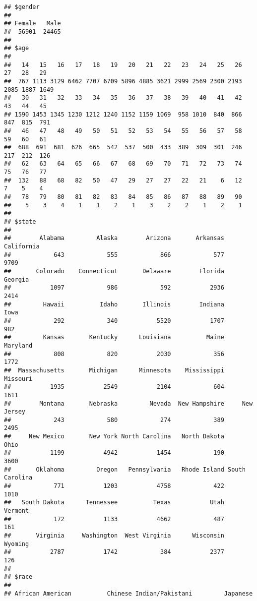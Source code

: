 \documentclass[
]{article}
\begin{document}
\begin{verbatim}
## $gender
## 
## Female   Male 
##  56901  24465 
## 
## $age
## 
##   14   15   16   17   18   19   20   21   22   23   24   25   26   27   28   29 
##  767 1113 3129 6462 7707 6709 5896 4885 3621 2999 2569 2300 2193 2085 1887 1649 
##   30   31   32   33   34   35   36   37   38   39   40   41   42   43   44   45 
## 1590 1453 1345 1230 1212 1240 1152 1159 1069  958 1010  840  866  847  815  791 
##   46   47   48   49   50   51   52   53   54   55   56   57   58   59   60   61 
##  688  691  681  626  665  542  537  500  433  389  309  301  246  217  212  126 
##   62   63   64   65   66   67   68   69   70   71   72   73   74   75   76   77 
##  132   88   68   82   50   47   29   27   27   22   21    6   12    7    5    4 
##   78   79   80   81   82   83   84   85   86   87   88   89   90 
##    5    3    4    1    1    2    1    3    2    2    1    2    1 
## 
## $state
## 
##        Alabama         Alaska        Arizona       Arkansas     California 
##            643            555            866            577           9709 
##       Colorado    Connecticut       Delaware        Florida        Georgia 
##           1097            986            592           2936           2414 
##         Hawaii          Idaho       Illinois        Indiana           Iowa 
##            292            340           5520           1707            982 
##         Kansas       Kentucky      Louisiana          Maine       Maryland 
##            808            820           2030            356           1772 
##  Massachusetts       Michigan      Minnesota    Mississippi       Missouri 
##           1935           2549           2104            604           1611 
##        Montana       Nebraska         Nevada  New Hampshire     New Jersey 
##            243            580            274            389           2495 
##     New Mexico       New York North Carolina   North Dakota           Ohio 
##           1199           4942           1454            190           3600 
##       Oklahoma         Oregon   Pennsylvania   Rhode Island South Carolina 
##            771           1203           4758            422           1010 
##   South Dakota      Tennessee          Texas           Utah        Vermont 
##            172           1133           4662            487            161 
##       Virginia     Washington  West Virginia      Wisconsin        Wyoming 
##           2787           1742            384           2377            126 
## 
## $race
## 
## African American          Chinese Indian/Pakistani         Japanese 

\end{verbatim}
\end{document}
